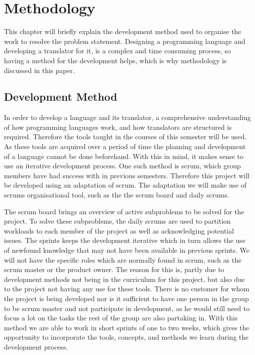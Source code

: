 \chapter{Methodology}\label{cha:methdology}   

This chapter will briefly explain the development method used to organise the work to resolve the problem statement. 
Designing a programming language and developing a translator for it, is a complex and time consuming process, so having a method for the development helps, which is why methodology is discussed in this paper.

\section{Development Method}
In order to develop a language and its translator, a comprehensive understanding of how programming languages work, and how translators are structured is required.
Therefore the tools taught in the courses of this semester will be used.
As these tools are acquired over a period of time the planning and development of a language cannot be done beforehand.
With this in mind, it makes sense to use an iterative development process.
One such method is scrum, which group members have had success with in previous semesters.
Therefore this project will be developed using an adaptation of scrum.
The adaptation we will make use of scrums organisational tool, such as the the scrum board and daily scrums.

The scrum board brings an overview of active subproblems to be solved for the project.
To solve these subproblems, the daily scrums are used to partition workloads to each member of the project as well as acknowledging potential issues.
The sprints keeps the development iterative which in turn allows the use of newfound knowledge that may not have been available in previous sprints.
We will not have the specific roles which are normally found in scrum, such as the scrum master or the product owner. \citep{Scrum}
The reason for this is, partly due to development methods not being in the curriculum for this project, but also due to the project not having any use for these tools.
There is no customer for whom the project is being developed nor is it sufficient to have  one person in the group to be scrum master and not participate in development, as he would still need to focus a lot on the tasks the rest of the group are also partaking in.
With this method we are able to work in short sprints of one to two weeks, which gives the opportunity to incorporate the tools, concepts, and methods we learn during the development process.

